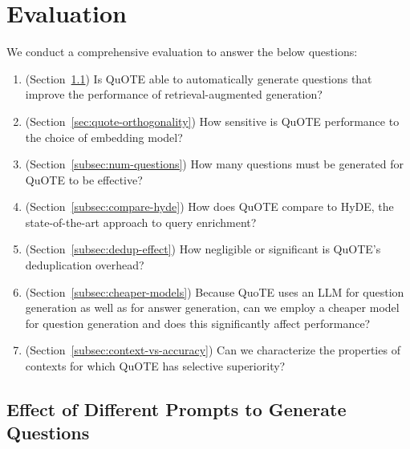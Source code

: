 \section{Evaluation}


We conduct a comprehensive evaluation
to answer the below questions:
\begin{enumerate}
\item (Section~\ref{subsec:prompt-effects}) Is QuOTE able to automatically generate questions that improve the performance of retrieval-augmented generation?
\item 
(Section~\ref{sec:quote-orthogonality})
How sensitive is QuOTE performance to the choice of embedding model?
\item (Section~\ref{subsec:num-questions})
How many questions must be generated for QuOTE to be effective?
\item (Section~\ref{subsec:compare-hyde}) How does QuOTE compare to HyDE, the state-of-the-art approach to query enrichment? 
\item (Section~\ref{subsec:dedup-effect}) How negligible or significant is QuOTE's deduplication overhead?
\item (Section~\ref{subsec:cheaper-models}) Because QuoTE uses an LLM for question generation as well as for answer generation, can we employ a cheaper model for question generation and does this significantly affect performance?
\item (Section~\ref{subsec:context-vs-accuracy}) Can we characterize the properties of contexts for which QuOTE has selective superiority?
\end{enumerate}


\subsection{Effect of Different Prompts to Generate Questions}
\label{subsec:prompt-effects}



